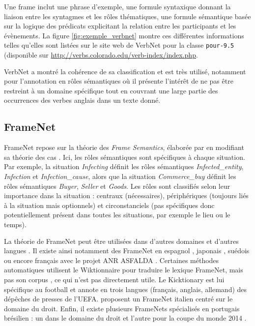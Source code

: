 Une frame inclut une phrase d'exemple, une formule syntaxique donnant la
liaison entre les syntagmes et les rôles thématiques, une formule sémantique
basée sur la logique des prédicats explicitant la relation entre les
participants et les évènements. La figure \ref{fig:exemple_verbnet} montre ces
différentes informations telles qu'elles sont listées sur le site web de
VerbNet pour la classe \texttt{pour-9.5} (disponible sur
\url{http://verbs.colorado.edu/verb-index/index.php}.


VerbNet a montré la cohérence de sa classification et est très utilisé,
notamment pour l'annotation en rôles sémantiques
\citep{swier2005exploiting,palmer2013semantic} où il présente l'intérêt de ne
pas être restreint à un domaine spécifique tout en couvrant une large partie
des occurrences des verbes anglais dans un texte donné.

\subsection{FrameNet}
\label{presentation_framenet}

FrameNet \citep{baker1998berkeley} repose sur la théorie des \textit{Frame
Semantics}, élaborée par \cite{fillmore1982frame} en modifiant sa théorie des
cas \citep{fillmore1968case}. Ici, les rôles sémantiques sont spécifiques à
chaque situation. Par exemple, la situation \textit{Infecting} définit les rôles
sémantiques \textit{Infected\_entity}, \textit{Infection} et
\textit{Infection\_cause}, alors que la situation \textit{Commerce\_buy} définit les
rôles sémantiques \textit{Buyer}, \textit{Seller} et \textit{Goods}. Les rôles sont
classifiés selon leur importance dans la situation : centraux (nécessaires),
périphériques (toujours liés à la situation mais optionnels) et circonstanciels
(pas spécifiques donc potentiellement présent dans toutes les situations, par
exemple le lieu ou le temps).

La théorie de FrameNet peut être utilisées dans d'autres domaines et d'autres
langues \citep{boas2009multilingual}. Il existe ainsi notamment des FrameNet en
espagnol \citep{subirats2003surprise}, japonais \citep{ohara2004japanese},
suédois \citep{heppin2012rocky} ou encore français avec le projet ANR ASFALDA
\citep{candito2014developing}. Certaines méthodes automatiques utilisent le
Wiktionnaire pour traduire le lexique FrameNet, mais pas son corpus
\citep{mouton2010framenet,hartmann2013framenet}, ce qui n'est pas directement
utile. Le Kicktionary \citep{schmidt2009kicktionary} est lui spécifique au
football et annote en trois langues (français, anglais, allemand) des dépêches
de presses de l'UEFA.  \cite{venturi2009towards} proposent un FrameNet italien
centré sur le domaine du droit. Enfin, il existe plusieurs FrameNets
spécialisés en portugais brésilien : un dans le domaine du droit
\citep{bertoldi2012frame} et l'autre pour la coupe du monde 2014
\citep{torrent2014copa}.

